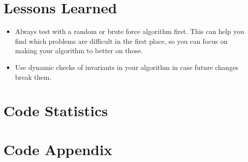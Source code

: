 \documentclass{article}
\begin{document}
\section{Lessons Learned}

\begin{itemize}
\item Always test with a random or brute force algorithm first. This can
help you find which problems are difficult in the first place, so you
can focus on making your algorithm to better on those.
\item Use dynamic checks of invariants in your algorithm in case future
changes break them.
\end{itemize}

\section{Code Statistics}

\section{Code Appendix}




\end{document}
